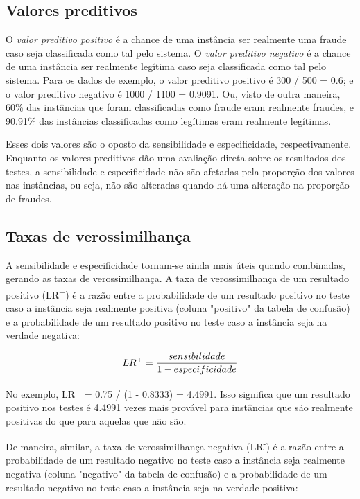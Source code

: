 \subsection{Valores preditivos}

O \emph{valor preditivo positivo} é a chance de uma instância ser realmente uma fraude caso seja classificada como tal pelo sistema. O \emph{valor preditivo negativo} é a chance de uma instância ser realmente legítima caso seja classificada como tal pelo sistema. Para os dados de exemplo, o valor preditivo positivo é 300 / 500 = 0.6; e o valor preditivo negativo é 1000 / 1100 = 0.9091. Ou, visto de outra maneira, 60\% das instâncias que foram classificadas como fraude eram realmente fraudes, e 90.91\% das instâncias classificadas como legítimas eram realmente legítimas.

Esses dois valores são o oposto da sensibilidade e especificidade, respectivamente. Enquanto os valores preditivos dão uma avaliação direta sobre os resultados dos testes, a sensibilidade e especificidade não são afetadas pela proporção dos valores nas instâncias, ou seja, não são alteradas quando há uma alteração na proporção de fraudes.

\subsection{Taxas de verossimilhança}

A sensibilidade e especificidade tornam-se ainda mais úteis quando combinadas, gerando as taxas de verossimilhança. A taxa de verossimilhança de um resultado positivo (LR\textsuperscript{+}) é a razão entre a probabilidade de um resultado positivo no teste caso a instância seja realmente positiva (coluna "positivo" da tabela de confusão) e a probabilidade de um resultado positivo no teste caso a instância seja na verdade negativa:

\begin{equation}
    \vspace{2mm}
    LR^{+}=\frac{sensibilidade}{1 - especificidade}
    \vspace{2mm}
\end{equation}

No exemplo, LR\textsuperscript{+} = 0.75 / (1 - 0.8333) = 4.4991. Isso significa que um resultado positivo nos testes é 4.4991 vezes mais provável para instâncias que são realmente positivas do que para aquelas que não são.

De maneira, similar, a taxa de verossimilhança negativa (LR\textsuperscript{-}) é a razão entre a probabilidade de um resultado negativo no teste caso a instância seja realmente negativa (coluna "negativo" da tabela de confusão) e a probabilidade de um resultado negativo no teste caso a instância seja na verdade positiva:


